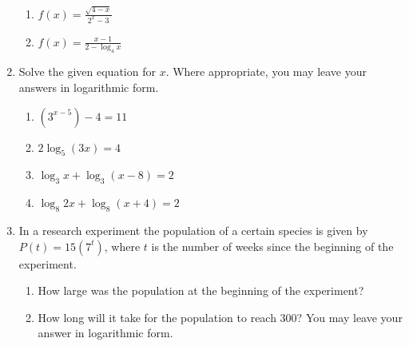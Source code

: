 \documentclass[12pt]{article}
\newif\ifans
\begin{document}
\begin{enumerate}
\begin{enumerate}
\item $f(x)=\frac{\sqrt{4-x}}{2^x-3}$

\ifans{\fbox{ $(-\infty,\log_2{3})\cup(\log_2{3},4]$}} \fi

\item $f(x)=\frac{x-1}{2-\log_4{x}}$

\ifans{\fbox{ $(0,16)\cup(16,\infty)$}} \fi

\end{enumerate}

\item Solve the given equation for $x$.  Where appropriate, you may leave your answers in logarithmic form.

\begin{enumerate}

\item $\displaystyle \left(3^{x-5}\right)-4=11$

\ifans \fbox{$\displaystyle x=\frac{\ln{15}}{\ln{3}}+5$} \fi

\item $\displaystyle 2\log_{5}{(3x)}=4$

\ifans \fbox{$\displaystyle x=\frac{25}{3}$} \fi

\item $\displaystyle \log_{3}{x}+\log_{3}{(x-8)}=2$

\ifans \fbox{$x=9$} \fi

\item $\displaystyle \log_{8}{2x}+\log_{8}{(x+4)}=2$

\ifans \fbox{$x=4$} \fi

\end{enumerate}

\item In a research experiment the population of a certain species is given by $P(t)=15(7^t)$, where $t$ is the number of weeks since the beginning of the experiment.

\begin{enumerate}

\item How large was the population at the beginning of the experiment?

\ifans \fbox{15} \fi

\item How long will it take for the population to reach 300?  You may leave your answer in logarithmic form.

\ifans \fbox{$\displaystyle \frac{\ln{20}}{\ln{7}}$ weeks} \fi

\end{enumerate}


\end{enumerate}
\end{document}
